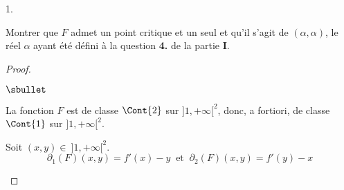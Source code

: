 \documentclass[11pt]{article}%
\begin{document}
\begin{noliste}{1.}
\setlength{\itemsep}{2mm}
\setcounter{enumi}{12}
\item Montrer que $F$ admet un point critique et un seul et qu'il 
s'agit 
de $(\alpha,\alpha)$, le réel $\alpha$ ayant été défini à la question 
{\bf 4.} de la partie {\bf I}.

\begin{proof}~
\begin{noliste}{$\sbullet$}
\item La fonction $F$ est de classe $\Cont{2}$ sur $]1,+\infty[^2$, 
donc, a fortiori, de classe $\Cont{1}$ sur $]1,+\infty[^2$.

\item Soit $(x,y)\in \ ]1,+\infty[^2$.
\[
\partial_1(F)(x,y)=f'(x)-y \ \mbox{ et } \ \partial_2(F)(x,y)=f'(y)-x
\]


\end{noliste}
\end{proof}
\end{noliste}
\end{document}
